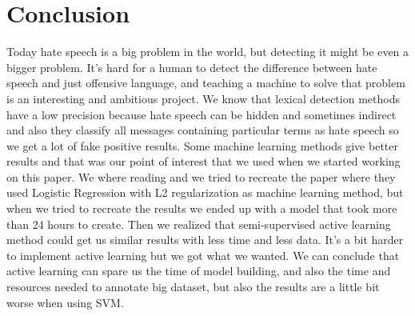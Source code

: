 \documentclass[10pt, a4paper]{article}
\begin{document}
\section{Conclusion}
Today hate speech is a big problem in the world, but detecting it might be even a bigger problem. It's hard for a human to detect the difference between hate speech and just offensive language, and teaching a machine to solve that problem is an interesting and ambitious project. We know that lexical detection methods have a low precision because hate speech can be hidden and sometimes indirect and also they classify all messages containing particular terms as hate speech so we get a lot of fake positive results. Some machine learning methods give better results and that was our point of interest that we used when we started working on this paper.
We where reading and we tried to recreate the paper \cite{Davidson2017AutomatedHS} where they used Logistic Regression with L2 regularization as machine learning method, but when we tried to recreate the results we ended up with a model that took more than 24 hours to create. Then we realized that semi-supervised active learning method could get us similar results with less time and less data. It's a bit harder to implement active learning but we got what we wanted. We can conclude that active learning can spare us the time of model building, and also the time and resources needed to annotate big dataset, but also the results are a little bit worse when using SVM.


 
\end{document}
